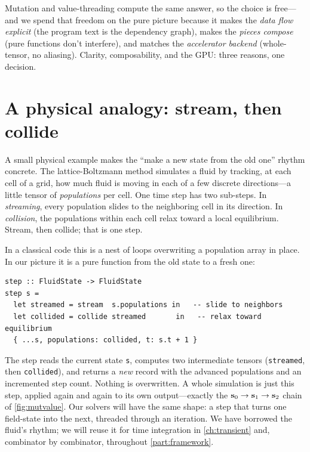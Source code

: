 \begin{keyidea}
Mutation and value-threading compute the same answer, so the choice is free---and
we spend that freedom on the pure picture because it makes the \emph{data flow
explicit} (the program text is the dependency graph), makes the \emph{pieces
compose} (pure functions don't interfere), and matches the \emph{accelerator
backend} (whole-tensor, no aliasing). Clarity, composability, and the GPU: three
reasons, one decision.
\end{keyidea}

\section{A physical analogy: stream, then collide}

A small physical example makes the ``make a new state from the old one'' rhythm
concrete. The lattice-Boltzmann method simulates a fluid by tracking, at each cell
of a grid, how much fluid is moving in each of a few discrete directions---a
little tensor of \emph{populations} per cell. One time step has two sub-steps. In
\emph{streaming}, every population slides to the neighboring cell in its
direction. In \emph{collision}, the populations within each cell relax toward a
local equilibrium. Stream, then collide; that is one step.

In a classical code this is a nest of loops overwriting a population array in
place. In our picture it is a pure function from the old state to a fresh one:

\begin{lstlisting}[style=l4style]
step :: FluidState -> FluidState
step s =
  let streamed = stream  s.populations in   -- slide to neighbors
  let collided = collide streamed       in   -- relax toward equilibrium
  { ...s, populations: collided, t: s.t + 1 }
\end{lstlisting}

\noindent The step reads the current state \texttt{s}, computes two intermediate
tensors (\texttt{streamed}, then \texttt{collided}), and returns a \emph{new}
record with the advanced populations and an incremented step count. Nothing is
overwritten. A whole simulation is just this step, applied again and again to its
own output---exactly the $\mathbf{s}_0 \to \mathbf{s}_1 \to \mathbf{s}_2$ chain of
\cref{fig:mutvalue}. Our solvers will have the same shape: a step that turns one
field-state into the next, threaded through an iteration. We have borrowed the
fluid's rhythm; we will reuse it for time integration in \cref{ch:transient} and,
combinator by combinator, throughout \cref{part:framework}.

